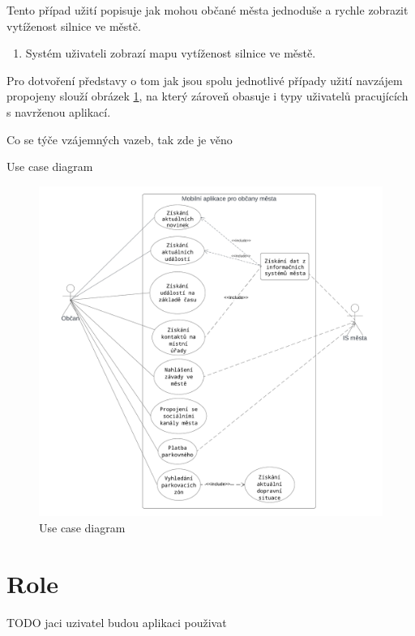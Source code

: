 Tento případ užití popisuje jak mohou občané města jednoduše a rychle zobrazit vytíženost silnice ve městě.

\begin{enumerate}
  \item Systém uživateli zobrazí mapu vytíženost silnice ve městě.
\end{enumerate}



Pro dotvoření představy o tom jak jsou spolu jednotlivé případy užití navzájem propojeny slouží obrázek \ref{}, na který zároveň 
obasuje i typy uživatelů pracujících s navrženou aplikací.

Co se týče vzájemných vazeb, tak zde je věno

Use case diagram
\begin{figure}[H]
  \centering
  \includegraphics[width=.99\textwidth]{Use case diagram.png}
  \caption{Use case diagram}
  \label{fig:use_case_diagram}
\end{figure}

\section{Role}

TODO jaci uzivatel budou aplikaci použivat



